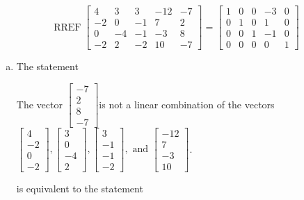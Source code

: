 \begin{exerciseAnswer} 
\[\operatorname{RREF}  \left[\begin{array}{cccc|c}
4 & 3 & 3 & -12 & -7 \\
-2 & 0 & -1 & 7 & 2 \\
0 & -4 & -1 & -3 & 8 \\
-2 & 2 & -2 & 10 & -7
\end{array}\right] = \left[\begin{array}{cccc|c}
1 & 0 & 0 & -3 & 0 \\
0 & 1 & 0 & 1 & 0 \\
0 & 0 & 1 & -1 & 0 \\
0 & 0 & 0 & 0 & 1
\end{array}\right] \]
\begin{enumerate}[(a)]
\item  The statement 
\begin{center}\begin{minipage}{0.8\textwidth}
 The vector \( \left[\begin{array}{c}
-7 \\
2 \\
8 \\
-7
\end{array}\right] \)is not a linear combination of the vectors \( \left[\begin{array}{c}
4 \\
-2 \\
0 \\
-2
\end{array}\right] , \left[\begin{array}{c}
3 \\
0 \\
-4 \\
2
\end{array}\right] , \left[\begin{array}{c}
3 \\
-1 \\
-1 \\
-2
\end{array}\right] , \text{ and } \left[\begin{array}{c}
-12 \\
7 \\
-3 \\
10
\end{array}\right] \). 
\end{minipage}\end{center}
     is equivalent to the statement 
\begin{center}\begin{minipage}{0.8\textwidth}

\end{minipage}
\end{center}
\end{enumerate}
\end{exerciseAnswer}
